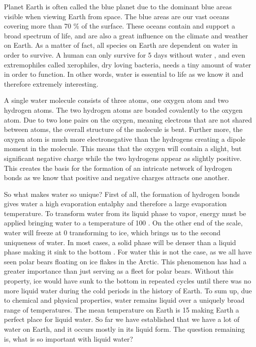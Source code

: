 Planet Earth is often called the blue planet due to the dominant blue areas visible when viewing Earth from space. The blue areas are our vast oceans covering more than 70 \% \cite{WikiEarth} of the surface. These oceans contain and support a broad spectrum of life, and are also a great influence on the climate and weather on Earth. As a matter of fact, all species on Earth are dependent on water in order to survive. A human can only survive for 5 days without water \cite{SurviveWater}, and even extremophiles called xerophiles, dry loving bacteria, needs a tiny amount of water in order to function. In other words, water is essential to life as we know it and therefore extremely interesting. 

A single water molecule consists of three atoms, one oxygen atom and two hydrogen atoms. The two hydrogen atoms are bonded covalently to the oxygen atom. Due to two lone pairs on the oxygen, meaning electrons that are not shared between atoms, the overall structure of the molecule is bent. Further more, the oxygen atom is much more electronegative than the hydrogens creating a dipole moment in the molecule. This means that the oxygen will contain a slight, but significant negative charge while the two hydrogens appear as slightly positive. This creates the basis for the formation of an intricate network of hydrogen bonds as we know that positive and negative charges attracts one another.  

So what makes water so unique? First of all, the formation of hydrogen bonds gives water a high evaporation entalphy and therefore a large evaporation temperature. To transform water from its liquid phase to vapor, energy must be applied bringing water to a temperature of 100 \textcelsius. On the other end of the scale, water will freeze at 0 \textcelsius transforming to ice, which brings us to the second uniqueness of water. In most cases, a solid phase will be denser than a liquid phase making it sink to the bottom \cite{SolidWater}. For water this is not the case, as we all have seen polar bears floating on ice flakes in the Arctic. This phenomenon has had a greater importance than just serving as a fleet for polar bears. Without this property, ice would have sunk to the bottom in repeated cycles until there was no more liquid water during the cold periods in the history of Earth. To sum up, due to chemical and physical properties, water remains liquid over a uniquely broad range of temperatures. The mean temperature on Earth is 15 \textcelsius \cite{WikiEarth} making Earth a perfect place for liquid water. So far we have established that we have a lot of water on Earth, and it occurs mostly in its liquid form. The question remaining is, what is so important with liquid water? 

